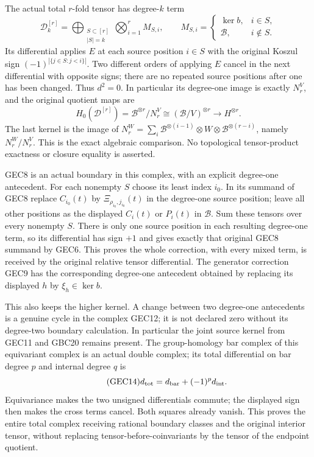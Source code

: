 The actual total $r$-fold tensor has degree-$k$ term
\begin{equation}\tag{GEC12}
 \mathscr D^{[r]}_k=
 \bigoplus_{\substack{S\subset[r]\\|S|=k}}
       \bigotimes_{i=1}^r M_{S,i},\qquad
 M_{S,i}=\begin{cases}\ker b,&i\in S,\\\mathscr B,&i\notin S.
                         \end{cases}
\end{equation}
Its differential applies $E$ at each source position $i\in S$
with the original Koszul sign $(-1)^{|\{j\in S:j<i\}|}$.
Two different orders of applying $E$ cancel in the next
differential with opposite signs; there are no repeated
source positions after one has been changed. Thus $d^2=0$.
In particular its degree-one image is exactly $N_r^V$,
and the original quotient maps are
\begin{equation}\tag{GEC13}
 H_0(\mathscr D^{[r]})
     =\mathscr B^{\otimes r}/N_r^V
     \cong(\mathscr B/V)^{\otimes r}
     \longrightarrow H^{\otimes r}.
\end{equation}
The last kernel is the image of
$N_r^W=\sum_i\mathscr B^{\otimes(i-1)}\otimes W
\otimes\mathscr B^{\otimes(r-i)}$, namely $N_r^W/N_r^V$.
This is the exact algebraic comparison. No topological
tensor-product exactness or closure equality is asserted.

GEC8 is an actual boundary in this complex, with an explicit
degree-one antecedent. For each nonempty $S$ choose its least
index $i_0$. In its summand of GEC8 replace $C_{i_0}(t)$ by
$\Xi_{\rho_{i_0},j_{i_0}}(t)$ in the degree-one source position;
leave all other positions as the displayed $C_i(t)$ or $P_i(t)$
in $\mathscr B$. Sum these tensors over every nonempty $S$.
There is only one source position in each resulting degree-one
term, so its differential has sign $+1$ and gives exactly
that original GEC8 summand by GEC6. This proves the whole
correction, with every mixed term, is received by the original
relative tensor differential. The generator correction GEC9
has the corresponding degree-one antecedent obtained by
replacing its displayed $h$ by $\xi_h\in\ker b$.

This also keeps the higher kernel. A change between two
degree-one antecedents is a genuine cycle in the complex
GEC12; it is not declared zero without its degree-two boundary
calculation. In particular the joint source kernel from
GEC11 and GBC20 remains present. The group-homology bar
complex of this equivariant complex is an actual double
complex; its total differential on bar degree $p$ and
internal degree $q$ is
\begin{equation}\tag{GEC14}
 d_{\rm tot}=d_{\rm bar}+(-1)^p d_{\rm int}.
\end{equation}
Equivariance makes the two unsigned differentials commute;
the displayed sign then makes the cross terms cancel.
Both squares already vanish. This proves the entire total
complex receiving rational boundary classes and the original
interior tensor, without replacing tensor-before-coinvariants
by the tensor of the endpoint quotient.

